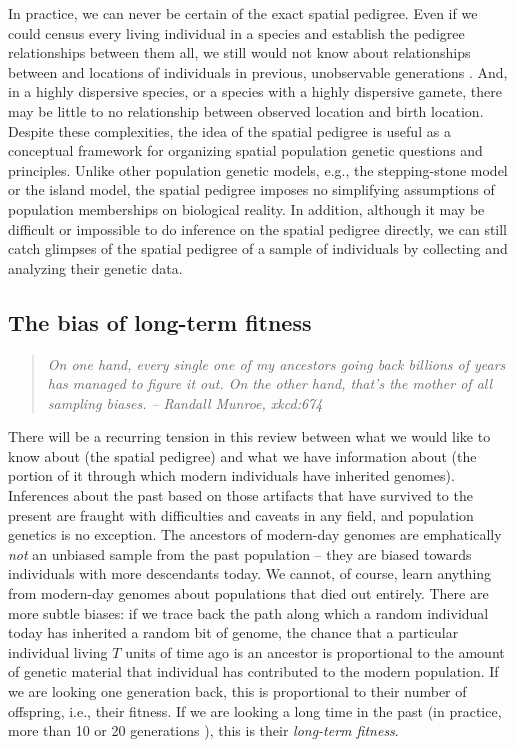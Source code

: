 \documentclass{ar-1col}
\begin{document}
In practice, we can never be certain of the exact spatial pedigree.
Even if we could census every living individual in a species
and establish the pedigree relationships between them all,
we still would not know about relationships between
and locations of individuals in previous, unobservable generations \citep{wilkins2004separationoftimescales}.
And, in a highly dispersive species,
or a species with a highly dispersive gamete,
there may be little to no relationship between observed location and birth location.
Despite these complexities,
the idea of the spatial pedigree is useful
as a conceptual framework for organizing
spatial population genetic questions and principles.
Unlike other population genetic models,
e.g., the stepping-stone model or the island model,
the spatial pedigree imposes no simplifying
assumptions of population memberships on biological reality.
In addition, although it may be difficult or impossible
to do inference on the spatial pedigree directly,
we can still catch glimpses of the spatial pedigree of a sample of individuals
by collecting and analyzing their genetic data.

\subsection{The bias of long-term fitness}

\begin{quote}
    \textit{
    On one hand, every single one of my ancestors going back billions of years
    has managed to figure it out.
    On the other hand, that's the mother of all sampling biases.}
    \hfill \textit{-- Randall Munroe, xkcd:674}
\end{quote}

There will be a recurring tension in this review
between what we would like to know about (the spatial pedigree)
and what we have information about 
(the portion of it through which modern individuals have inherited genomes).
Inferences about the past
based on those artifacts that have survived to the present
are fraught with difficulties and caveats in any field, 
and population genetics is no exception.
The ancestors of modern-day genomes are emphatically \textit{not} an unbiased sample
from the past population -- 
they are biased towards individuals with more descendants today.
We cannot, of course, learn anything from modern-day genomes
about populations that died out entirely.
There are more subtle biases:
if we trace back the path along which a random individual today 
has inherited a random bit of genome,
the chance that a particular individual living $T$ units of time ago is an ancestor
is proportional to the amount of genetic material that individual has contributed to the modern population.
If we are looking one generation back, 
this is proportional to their number of offspring, i.e., their fitness.
If we are looking a long time in the past
(in practice, more than 10 or 20 generations \citep{BartonEtheridge2011fitness}),
this is their \textit{long-term fitness}.
\end{document}

